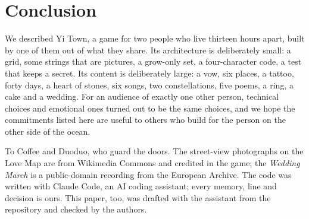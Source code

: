 \documentclass[sigconf,nonacm]{acmart}
\newcommand{\yt}{Yi Town}
\begin{document}
\section{Conclusion}
We described \yt{}, a game for two people who live thirteen hours apart, built by one of them out
of what they share. Its architecture is deliberately small: a grid, some strings that are pictures,
a grow-only set, a four-character code, a test that keeps a secret. Its content is deliberately
large: a vow, six places, a tattoo, forty days, a heart of stones, six songs, two constellations,
five poems, a ring, a cake and a wedding. For an audience of exactly one other person, technical
choices and emotional ones turned out to be the same choices, and we hope the commitments listed
here are useful to others who build for the person on the other side of the ocean.

\begin{acks}
To Coffee and Duoduo, who guard the doors. The street-view photographs on the Love Map are from
Wikimedia Commons and credited in the game; the \emph{Wedding March} is a public-domain recording
from the European Archive. The code was written with Claude Code, an AI coding assistant; every
memory, line and decision is ours. This paper, too, was drafted with the assistant from the
repository and checked by the authors.
\end{acks}

\balance


\end{document}
